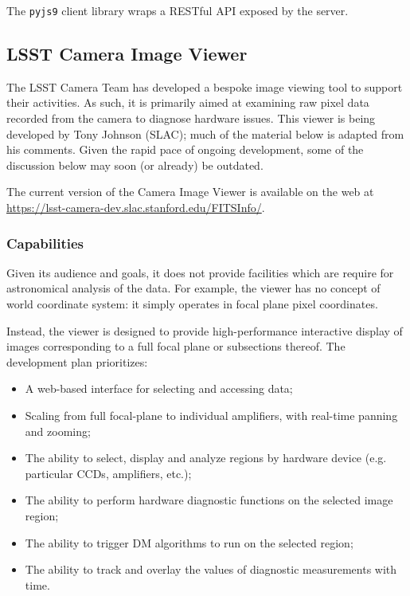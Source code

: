 The \texttt{pyjs9} client library wraps a RESTful API exposed by the server.


\subsection{LSST Camera Image Viewer}
\label{sec:existing_tools:camera}

The LSST Camera Team has developed a bespoke image viewing tool to support their activities.
As such, it is primarily aimed at examining raw pixel data recorded from the camera to diagnose hardware issues.
This viewer is being developed by Tony Johnson (SLAC); much of the material below is adapted from his comments.
Given the rapid pace of ongoing development, some of the discussion below may soon (or already) be outdated.

The current version of the Camera Image Viewer is available on the web at \url{https://lsst-camera-dev.slac.stanford.edu/FITSInfo/}.

\subsubsection{Capabilities}

Given its audience and goals, it does not provide facilities which are require for astronomical analysis of the data.
For example, the viewer has no concept of world coordinate system: it simply operates in focal plane pixel coordinates.

Instead, the viewer is designed to provide high-performance interactive display of images corresponding to a full focal plane or subsections thereof.
The development plan prioritizes:

\begin{itemize}

  \item{A web-based interface for selecting and accessing data;}
  \item{Scaling from full focal-plane to individual amplifiers, with real-time panning and zooming;}
  \item{The ability to select, display and analyze regions by hardware device (e.g. particular CCDs, amplifiers, etc.);}
  \item{The ability to perform hardware diagnostic functions on the selected image region;}
  \item{The ability to trigger DM algorithms to run on the selected region;}
  \item{The ability to track and overlay the values of diagnostic measurements with time.}

\end{itemize}

